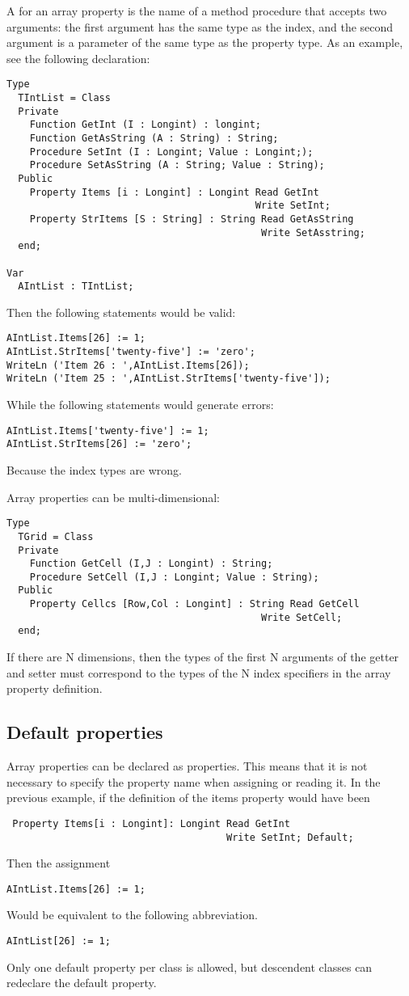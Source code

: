 A  for an array property is the name of a method
procedure that accepts two arguments: the first argument has the same
type as the index, and the second argument is a parameter of the same
type as the property type.
As an example, see the following declaration:
\begin{verbatim}
Type
  TIntList = Class
  Private
    Function GetInt (I : Longint) : longint;
    Function GetAsString (A : String) : String;
    Procedure SetInt (I : Longint; Value : Longint;);
    Procedure SetAsString (A : String; Value : String);
  Public
    Property Items [i : Longint] : Longint Read GetInt
                                           Write SetInt;
    Property StrItems [S : String] : String Read GetAsString
                                            Write SetAsstring;
  end;

Var
  AIntList : TIntList;
\end{verbatim}
Then the following statements would be valid:
\begin{verbatim}
AIntList.Items[26] := 1;
AIntList.StrItems['twenty-five'] := 'zero';
WriteLn ('Item 26 : ',AIntList.Items[26]);
WriteLn ('Item 25 : ',AIntList.StrItems['twenty-five']);
\end{verbatim}
While the following statements would generate errors:
\begin{verbatim}
AIntList.Items['twenty-five'] := 1;
AIntList.StrItems[26] := 'zero';
\end{verbatim}
Because the index types are wrong.

Array properties can be multi-dimensional:
\begin{verbatim}
Type
  TGrid = Class
  Private
    Function GetCell (I,J : Longint) : String;
    Procedure SetCell (I,J : Longint; Value : String);
  Public
    Property Cellcs [Row,Col : Longint] : String Read GetCell
                                            Write SetCell;
  end;
\end{verbatim}
If there are N dimensions, then the types of the first N arguments of the getter and
setter must correspond to the types of the N index specifiers in the array property definition.


\subsection{Default properties}
Array properties can be declared as  properties. This means that
it is not necessary to specify the property name when assigning or reading
it. In the previous example, if the definition of the items property would
have been
\begin{verbatim}
 Property Items[i : Longint]: Longint Read GetInt
                                      Write SetInt; Default;
\end{verbatim}
Then the assignment
\begin{verbatim}
AIntList.Items[26] := 1;
\end{verbatim}
Would be equivalent to the following abbreviation.
\begin{verbatim}
AIntList[26] := 1;
\end{verbatim}
Only one default property per class is allowed, but descendent classes
can redeclare the default property.

